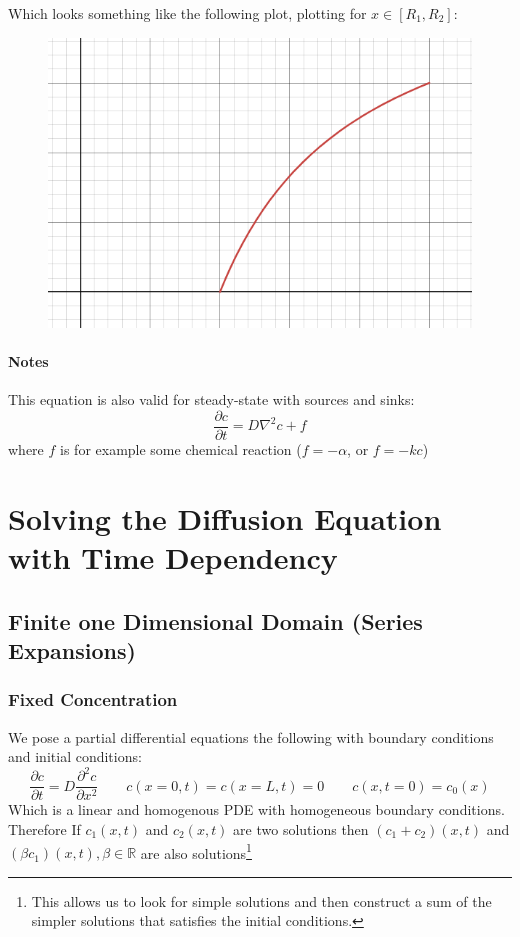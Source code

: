Which looks something like the following plot, plotting for $x\in[R_1,R_2]$:
\begin{figure}[H]
	\centering
	\includegraphics[width=0.4\linewidth]{Sketches/SpheresDiffusionPlot}
	
	\label{fig:spheresdiffusionplot}
\end{figure}

\paragraph{Notes}
This equation is also valid for steady-state with sources and sinks:
\begin{equation*}
	\frac{\partial c}{\partial t} = D \nabla^2c+f
\end{equation*}
where $f$ is for example some chemical reaction ($f=-\alpha$, or $f=-kc$)


\section{Solving the Diffusion Equation with Time Dependency}

\subsection{Finite one Dimensional Domain (Series Expansions)}
\subsubsection{Fixed Concentration}

We pose a partial differential equations the following with boundary conditions and initial conditions:
\begin{equation*}
	\frac{\partial c}{\partial t} = D\frac{\partial^2 c}{\partial x^2}
	\qquad c(x=0,t)=c(x=L,t)=0\qquad c(x,t=0)=c_0(x)
\end{equation*}
Which is a linear and homogenous PDE  with homogeneous boundary conditions.
Therefore If $c_1(x,t)$ and $c_2(x,t)$ are two solutions then $(c_1+c_2)(x,t)$ and $(\beta c_1)(x,t), \beta \in \mathbb R$ are also solutions\footnote{This allows us to look for simple solutions and then construct a sum of the simpler solutions that satisfies the initial conditions.}




\setcounter{chapter}{4}
\renewcommand{\thechapter}{\arabic{chapter}}


